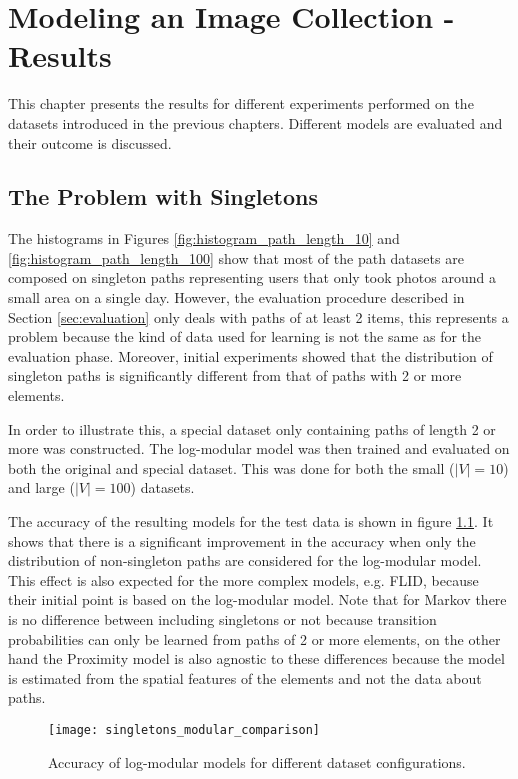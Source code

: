 \chapter{Modeling an Image Collection - Results}
\label{sec:results}

This chapter presents the results for different experiments performed on the datasets introduced in the previous chapters. Different models are evaluated and their outcome is discussed.

\section{The Problem with Singletons}

The histograms in Figures \ref{fig:histogram_path_length_10} and \ref{fig:histogram_path_length_100} show that most of the path datasets are composed on singleton paths representing users that only took photos around a small area on a single day. However, the evaluation procedure described in Section \ref{sec:evaluation} only deals with paths of at least 2 items, this represents a problem because the kind of data used for learning is not the same as for the evaluation phase. Moreover, initial experiments showed that the distribution of singleton paths is significantly different from that of paths with 2 or more elements.

In order to illustrate this, a special dataset only containing paths of length 2 or more was constructed. The log-modular model was then trained and evaluated on both the original and special dataset. This was done for both the small ($|V|=10$) and large ($|V|=100$) datasets.

The accuracy of the resulting models for the test data is shown in figure \ref{fig:comparison_singletons_modular}. It shows that there is a significant improvement in the accuracy when only the distribution of non-singleton paths are considered for the log-modular model. This effect is also expected for the more complex models, e.g. FLID, because their initial point is based on the log-modular model. Note that for Markov there is no difference between including singletons or not because transition probabilities can only be learned from paths of 2 or more elements, on the other hand the Proximity model is also agnostic to these differences because the model is estimated from the spatial features of the elements and not the data about paths.

\begin{figure}
  \centering
  \texttt{[image: singletons\_modular\_comparison]}
  \caption{Accuracy of log-modular models for different dataset configurations.}
  \label{fig:comparison_singletons_modular}
\end{figure}

